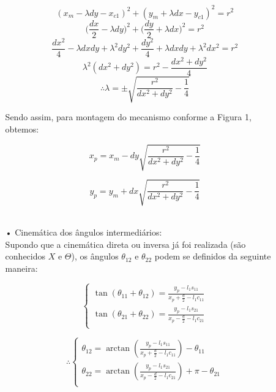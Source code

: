\documentclass[12pt,a4paper]{article}
\begin{document}
\begin{itemize}
\begin{itemize}
		$$ (x_m - \lambda dy  - x_{c1})^2 + (y_m + \lambda dx  - y_{c1})^2 = r^2 $$
		$$ \Big( \frac{dx}{2} - \lambda dy \Big)^2 + \Big( \frac{dy}{2} + \lambda dx \Big)^2 = r^2 $$
		$$ \frac{dx^2}{4} - \lambda dx dy + \lambda^2 dy^2 + \frac{dy^2}{4} + \lambda dx dy + \lambda^2 dx^2 = r^2 $$
		$$ \lambda^2 (dx^2 + dy^2) = r^2 - \frac{dx^2 + dy^2}{4} $$
		$$ \therefore \lambda = \pm \sqrt{ \frac{r^2}{dx^2 + dy^2} - \frac{1}{4} } $$
	
		Sendo assim, para montagem do mecanismo conforme a Figura 1, obtemos:
	
		\begin{equation}
		x_p = x_m - dy \sqrt{ \frac{r^2}{dx^2 + dy^2} - \frac{1}{4} }
		\end{equation}
	
		\begin{equation}
		y_p = y_m + dx \sqrt{ \frac{r^2}{dx^2 + dy^2} - \frac{1}{4} }
		\end{equation} \\
	
	    \item[•] Cinemática dos ângulos intermediários: \\
	
		Supondo que a cinemática direta ou inversa já foi realizada (são conhecidos $X$ e $\Theta$), os ângulos $\theta_{12}$ e $\theta_{22}$ podem se definidos da seguinte maneira:
	
		$$
		\begin{cases}
		\tan ( \theta_{11} + \theta_{12} ) = \frac{y_p - l_1 s_{11}}{x_p +\frac{d}{2} - l_1 c_{11}} \\
		\tan ( \theta_{21} + \theta_{22} ) = \frac{y_p - l_1 s_{21}}{x_p -\frac{d}{2} - l_1 c_{21}} \\
		\end{cases}	
		$$
	
		\begin{equation}
		\therefore
		\begin{cases}
		\theta_{12}  = \arctan( \frac{y_p - l_1 s_{11}}{x_p +\frac{d}{2} - l_1 c_{11}}) - \theta_{11} \\
		\theta_{22}  = \arctan( \frac{y_p - l_1 s_{21}}{x_p -\frac{d}{2} - l_1 c_{21}}) + \pi - \theta_{21}\\
		\end{cases}	
		\end{equation}\\
	
		\end{itemize}
		

\end{itemize}
\end{document}
